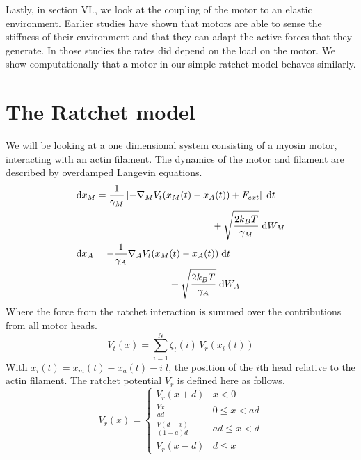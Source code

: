 \documentclass[aps,pre,twocolumn,showpacs,showkeys,a4paper]{revtex4}
\newcommand{\rmd}{{\mathrm d}}
\begin{document}
Lastly, in section VI., we look at the coupling of the motor to an elastic environment. %
Earlier studies have shown that  motors are able to sense the stiffness of their environment and that they can adapt the active forces that they generate. 
In those studies the rates did depend on the load on the motor. We show computationally that a motor in our simple ratchet model behaves similarly.


\section{The Ratchet model}
\label{sec:ratchet}
We will be looking at a one dimensional system consisting of a myosin motor, interacting with an actin filament. The dynamics of the motor and filament are described by overdamped Langevin equations. 
\begin{align}
&\begin{multlined}[b][.35\textwidth]
\rmd x_M = 
\frac{1}{\gamma_M} \left[ - \nabla_M V_t(x_M(t) - x_A(t)) + F_{ext} \right] \; \rmd t \\ 
+ \sqrt{ \frac{2 k_B T}{\gamma_M} } \; \rmd W_M 
\end{multlined}
\label{eom_M} \\
&\begin{multlined}[b][.35\textwidth]
\rmd x_A = 
- \frac{1}{\gamma_A} \nabla_A V_t(x_M(t) - x_A(t)) \; \rmd t \\
+ \sqrt{ \frac{2 k_B T}{\gamma_A} } \; \rmd W_A
\end{multlined}
\label{eom_A}
\end{align}
Where the force from the ratchet interaction is summed over the contributions from all motor heads.
\begin{equation}
V_t(x) = \sum_{i=1}^{N} \zeta_t(i) \, V_{r} (x_i(t))
\end{equation}
With $x_i(t) = x_{m}(t)-x_{a}(t) - i\;l$, the position of the $i$th head relative to the actin filament.
The ratchet potential $V_r$ is defined here as follows.
\begin{equation}
V_{r}(x) =  \begin{cases}
        V_r(x+d) & x < 0 \\[1ex] 
        \displaystyle \frac{ V x }{ a d } & 0 \leq x < a d \\[2ex]
        \displaystyle \frac{ V (d-x) }{ (1-a) d } & a d \leq x < d \\[2ex]
        V_r(x-d) & d \leq x  
   \end{cases}
   \label{rat_pot}
\end{equation}
\end{document}
